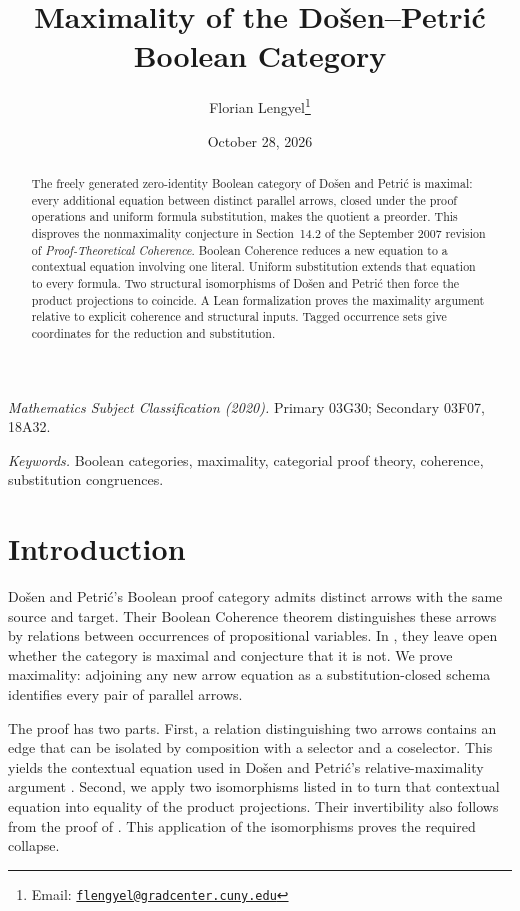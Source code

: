 \documentclass[11pt]{article}
\title{Maximality of the Do\v{s}en--Petri\'c Boolean Category}
\author{Florian Lengyel\thanks{Email: \href{mailto:flengyel@gradcenter.cuny.edu}{\texttt{flengyel@gradcenter.cuny.edu}}}}
\date{October 28, 2026}
\begin{document}
\maketitle

\begin{abstract}
The freely generated zero-identity Boolean category of Do\v{s}en and
Petri\'c is maximal: every additional equation between distinct parallel
arrows, closed under the proof operations and uniform formula
substitution, makes the quotient a preorder. This disproves the
nonmaximality conjecture in Section~14.2 of the September 2007 revision
of \emph{Proof-Theoretical Coherence}. Boolean Coherence reduces a new
equation to a contextual equation involving one literal. Uniform
substitution extends that equation to every formula. Two structural
isomorphisms of Do\v{s}en and Petri\'c then force the product projections
to coincide. A Lean formalization proves the maximality argument
relative to explicit coherence and structural inputs. Tagged occurrence
sets give coordinates for the reduction and substitution.
\end{abstract}

\medskip
\noindent\textit{Mathematics Subject Classification (2020).}
Primary 03G30; Secondary 03F07, 18A32.

\smallskip
\noindent\textit{Keywords.} Boolean categories, maximality, categorial proof theory,
coherence, substitution congruences.

\section{Introduction}

Do\v{s}en and Petri\'c's Boolean proof category admits distinct arrows
with the same source and target. Their Boolean Coherence theorem
distinguishes these arrows by relations between occurrences of
propositional variables. In \cite[\S14.2, p.~322]{DP}, they leave open
whether the category is maximal and conjecture that it is not. We prove
maximality: adjoining any new arrow equation as a substitution-closed
schema identifies every pair of parallel arrows.

The proof has two parts. First, a relation distinguishing two arrows
contains an edge that can be isolated by composition with a selector
and a coselector. This yields the contextual equation used in
Do\v{s}en and Petri\'c's relative-maximality argument
\cite[\S9.7, pp.~215--216]{DP}. Second, we apply two isomorphisms listed in
\cite[\S12.5, p.~294]{DP} to turn that contextual equation into equality
of the product projections. Their invertibility also follows from the
proof of \cite[Lemma~7]{DPIsomorphic}. This application of the
isomorphisms proves the required collapse.
\end{document}

